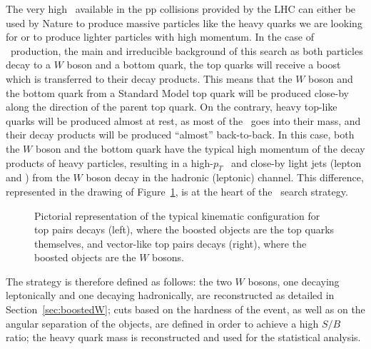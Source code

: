 The very high \cme\ available in the pp collisions provided by the LHC
can either be used by Nature to produce massive particles like the heavy 
quarks we are looking for or to produce lighter particles with high momentum.
In the case of \ttbar\ production, the main and irreducible background
of this search as both particles decay to a $W$ boson and a bottom quark,
the top quarks will receive a boost which is transferred to their decay
products. This means that the $W$ boson and the bottom quark from a Standard
Model top quark will be produced close-by along the direction of the parent
top quark. On the contrary, heavy top-like quarks will be produced almost
at rest, as most of the \cme\ goes into their mass, and their
decay products will be produced ``almost'' back-to-back. In this case,
both the $W$ boson and the bottom quark have the typical high
momentum of the decay products of heavy particles, 
resulting in a high-$p_T$ \bjet\ and close-by light jets (lepton and \met)
from the $W$ boson decay in the hadronic (leptonic) channel. This
difference, represented in the drawing of Figure~\ref{fig:boostedkin},
is at the heart of the \wbx\ search strategy.

\begin{figure}[htb]\begin{center}
	\caption{Pictorial representation of the typical kinematic configuration
        for top pairs decays (left), where the boosted objects are the top
        quarks themselves, and vector-like top pairs decays (right), where the
        boosted objects are the $W$ bosons.\label{fig:boostedkin}}
\end{center}\end{figure}

The strategy is therefore defined as follows:
the two $W$ bosons, one decaying leptonically and
one decaying hadronically, are reconstructed
as detailed in Section~\ref{sec:boostedW};
cuts based on the hardness of the event, as well
as on the angular separation of the objects, are
defined in order to achieve a high $S/B$ ratio;
the heavy quark mass is reconstructed and used
for the statistical analysis.

